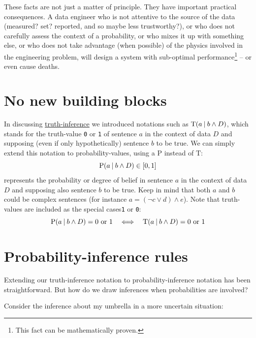 \documentclass[
  a4paper,
  DIV=11,
  numbers=noendperiod,
  oneside]{scrreprt}
\begin{document}
These facts are not just a matter of principle. They have important
practical consequences. A data engineer who is not attentive to the
source of the data (measured? set? reported, and so maybe less
trustworthy?), or who does not carefully assess the context of a
probability, or who mixes it up with something else, or who does not
take advantage (when possible) of the physics involved in the
engineering problem, will design a system with sub-optimal
performance\footnote{This fact can be mathematically proven.} -- or even
cause deaths.

\hypertarget{no-new-building-blocks}{%
\section{No new building blocks}\label{no-new-building-blocks}}

In discussing \protect\hyperlink{sec-truth-inference}{truth-inference}
we introduced notations such as
\(\mathrm{T}(a \nonscript\:\vert\nonscript\:\mathopen{} b \land D)\),
which stands for the truth-value \texttt{0} or \texttt{1} of sentence
\(a\) in the context of data \(D\) and supposing (even if only
hypothetically) sentence \(b\) to be true. We can simply extend this
notation to probability-values, using a \(\mathrm{P}\) instead of
\(\mathrm{T}\):
\[\mathrm{P}(a \nonscript\:\vert\nonscript\:\mathopen{} b \land D) \in [0,1]\]
represents the probability or degree of belief in sentence \(a\) in the
context of data \(D\) and supposing also sentence \(b\) to be true. Keep
in mind that both \(a\) and \(b\) could be complex sentences (for
instance \(a = (\lnot c \lor d) \land e\)). Note that truth-values are
included as the special cases\texttt{1} or \texttt{0}: \[
\mathrm{P}(a \nonscript\:\vert\nonscript\:\mathopen{} b \land D) = 0\text{ or }1
\quad\Longleftrightarrow\quad
\mathrm{T}(a \nonscript\:\vert\nonscript\:\mathopen{} b \land D) = 0\text{ or }1
\]

\hypertarget{probability-inference-rules}{%
\section{Probability-inference
rules}\label{probability-inference-rules}}

Extending our truth-inference notation to probability-inference notation
has been straightforward. But how do we draw inferences when
probabilities are involved?

Consider the inference about my umbrella in a more uncertain situation:
\end{document}
